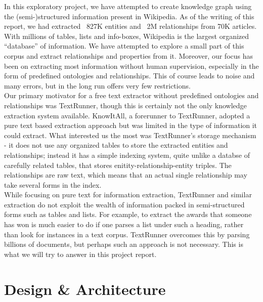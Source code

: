 \documentclass[12pt,twocolumn]{article}
\begin{document}
In this exploratory project, we have attempted to create knowledge graph using the (semi-)structured information present in Wikipedia. As of the writing of this report, we had extracted ~827K entities and ~2M relationships from 70K articles. With millions of tables, lists and info-boxes, Wikipedia is the largest organized ``database'' of information. We have attempted to explore a small part of this corpus and extract relationships and properties from it. Moreover, our focus has been on extracting most information without human supervision, especially in the form of predefined ontologies and relationships. This of course leads to noise and many errors, but in the long run offers very few restrictions.\\

Our primary motivator for a free text extractor without predefined ontologies and relationships was TextRunner, though this is certainly not the only knowledge extraction system available. KnowItAll, a forerunner to TextRunner, adopted a pure text based extraction approach but was limited in the type of information it could extract. What interested us the most was TextRunner's storage mechanism - it does not use any organized tables to store the extracted entities and relationships; instead it has a simple indexing system, quite unlike a databse of carefully related tables, that stores enitity-relationship-entity triples. The relationships are raw text, which means that an actual single relationship may take several forms in the index.\\

While focusing on pure text for information extraction, TextRunner and similar extraction do not exploit the wealth of information packed in semi-structured forms such as tables and lists. For example, to extract the awards that someone has won is much easier to do if one parses a list under such a heading, rather than look for instances in a text corpus. TextRunner overcomes this by parsing billions of documents, but perhaps such an approach is not necessary. This is what we will try to answer in this project report.


\section{Design \& Architecture}
\end{document}
